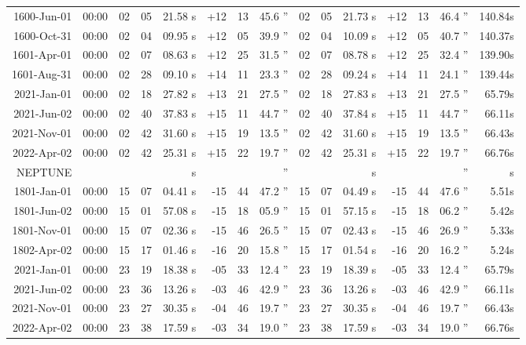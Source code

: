 \begin{longtable}{r@{\,}r|r@{h\,}r@{m\,}r<{s}|r@{°\,}r@{'\,}r<{''}||r@{h\,}r@{m\,}r<{s}|r@{°\,}r@{'\,}r<{''}r<{s}}
 1600-Jun-01 & 00:00  &   02 & 05 & 21.58 & +12 & 13 & 45.6 & 02&05&21.73 & +12&13&46.4 & 140.84\\ %
 1600-Oct-31 & 00:00  &   02 & 04 & 09.95 & +12 & 05 & 39.9 & 02&04&10.09 & +12&05&40.7 & 140.37\\ %
 1601-Apr-01 & 00:00  &   02 & 07 & 08.63 & +12 & 25 & 31.5 & 02&07&08.78 & +12&25&32.4 & 139.90\\ %
 1601-Aug-31 & 00:00  &   02 & 28 & 09.10 & +14 & 11 & 23.3 & 02&28&09.24 & +14&11&24.1 & 139.44\\ %
 2021-Jan-01 & 00:00  &   02 & 18 & 27.82 & +13 & 21 & 27.5 & 02&18&27.83 & +13&21&27.5 & 65.79\\ %
 2021-Jun-02 & 00:00  &   02 & 40 & 37.83 & +15 & 11 & 44.7 & 02&40&37.84 & +15&11&44.7 & 66.11\\ %
 2021-Nov-01 & 00:00  &   02 & 42 & 31.60 & +15 & 19 & 13.5 & 02&42&31.60 & +15&19&13.5 & 66.43\\ %
 2022-Apr-02 & 00:00  &   02 & 42 & 25.31 & +15 & 22 & 19.7 & 02&42&25.31 & +15&22&19.7 & 66.76\\ %
NEPTUNE     \\
 1801-Jan-01 & 00:00  &   15 & 07 & 04.41 & -15 & 44 & 47.2 & 15&07&04.49 & -15&44&47.6 & 5.51\\ %
 1801-Jun-02 & 00:00  &   15 & 01 & 57.08 & -15 & 18 & 05.9 & 15&01&57.15 & -15&18&06.2 & 5.42\\ %
 1801-Nov-01 & 00:00  &   15 & 07 & 02.36 & -15 & 46 & 26.5 & 15&07&02.43 & -15&46&26.9 & 5.33\\ %
 1802-Apr-02 & 00:00  &   15 & 17 & 01.46 & -16 & 20 & 15.8 & 15&17&01.54 & -16&20&16.2 & 5.24\\ %
 2021-Jan-01 & 00:00  &   23 & 19 & 18.38 & -05 & 33 & 12.4 & 23&19&18.39 & -05&33&12.4 & 65.79\\ %
 2021-Jun-02 & 00:00  &   23 & 36 & 13.26 & -03 & 46 & 42.9 & 23&36&13.26 & -03&46&42.9 & 66.11\\ %
 2021-Nov-01 & 00:00  &   23 & 27 & 30.35 & -04 & 46 & 19.7 & 23&27&30.35 & -04&46&19.7 & 66.43\\ %
 2022-Apr-02 & 00:00  &   23 & 38 & 17.59 & -03 & 34 & 19.0 & 23&38&17.59 & -03&34&19.0 & 66.76\\ %

\end{longtable}
